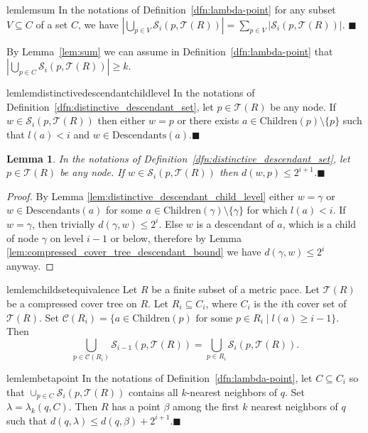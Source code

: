 \documentclass[a4paper,UKenglish,cleveref, autoref]{lipics-v2019}
\numberwithin{algocf}{section}
\theoremstyle{definition}
\theoremstyle{definition}
\theoremstyle{definition}
\theoremstyle{plain}
\newtheorem{lem}[algocf]{Lemma}
\newcommand{\Child}{\mathrm{Children}}
\newcommand{\Desc}{\mathrm{Descendants}}
\newcommand{\C}{\mathcal{C}}
\newcommand{\T}{\mathcal{T}}
\newcommand{\Sd}{\mathcal{S}}
\newcommand{\be}{\beta}
\newcommand{\la}{\lambda}
\newcommand{\bs}{\hfill $\blacksquare$}
\begin{document}
\begin{restatable} {lem}{lemsum}
\label{lem:sum}
In the notations of Definition~\ref{dfn:lambda-point} for any subset $V \subseteq C$ of a set $C$, we have $|\bigcup\limits_{p \in V}\Sd_i(p,\T(R))| = \sum\limits_{p \in V} |\Sd_i(p, \T(R))|.$
\bs
\end{restatable}

By Lemma~\ref{lem:sum} we can assume in Definition~\ref{dfn:lambda-point} that $|\bigcup_{p \in C}\Sd_i(p, \T(R)) | \geq k$.

\begin{restatable}{lem}{lemdistinctivedescendantchildlevel}
\label{lem:distinctive_descendant_child_level}
In the notations of Definition~\ref{dfn:distinctive_descendant_set}, let $p \in \T(R)$ be any node. 
If $w \in \Sd_i(p,\T(R))$ then either $w = p$ or there exists $a \in \Child(p) \setminus \{p\}$ such that $l(a) < i$ and $w \in \Desc(a)$.\bs
\end{restatable}

\begin{lem}
\label{lem:distinctive_descendant_distance}
In the notations of Definition~\ref{dfn:distinctive_descendant_set}, let $p \in \T(R)$ be any node. 
If $w \in \Sd_i(p,\T(R))$ then $d(w,p) \leq 2^{i+1}$.\bs
\end{lem}
\begin{proof}
By Lemma \ref{lem:distinctive_descendant_child_level} either $w = \gamma$ or $w \in \Desc(a)$ for some $a \in \Child(\gamma) \setminus \{\gamma\}$ for which $l(a) < i$.
If $w = \gamma$, then trivially $d(\gamma, w) \leq 2^{i}$. Else $w$ is a descendant of $a$, which is a child of node $\gamma$ on level $i-1$ or below, therefore by Lemma \ref{lem:compressed_cover_tree_descendant_bound} we have  $d(\gamma, w) \leq 2^{i}$ anyway.
\end{proof}

 \begin{restatable} {lem}{lemchildsetequivalence}
\label{lem:child_set_equivalence}
Let $R$ be a finite subset of a metric pace.
Let $\T(R)$ be a compressed cover tree on $R$. 
Let $R_i \subseteq C_i$, where $C_i$ is the $i$th cover set of $\T(R)$. Set $\C(R_i) = \{a \in \Child(p) \text{ for some }p \in R_i \mid l(a) \geq i-1 \} $.
Then 
$$\bigcup_{p \in \C(R_i)}\Sd_{i-1}(p, \T(R)) = \bigcup_{p \in R_i}\Sd_{i}(p, \T(R)).$$
\end{restatable}

 \begin{restatable}[$\be$-point {\cite[Lemma~5.13]{elkin2021new}}]{lem}{lembetapoint}
\label{lem:beta_point}
In the notations of Definition~\ref{dfn:lambda-point}, let $C\subseteq C_i$ so that $\cup_{p \in C}\Sd_i(p, \T(R))$ contains all $k$-nearest neighbors of $q$. 
Set $\la = \la_k(q,C)$. 
Then $R$ has a point $\beta$ among the first $k$ nearest neighbors of $q$ such that $d(q,\lambda) \leq  d(q,\beta) + 2^{i+1}$.\bs
\end{restatable}
\end{document}
